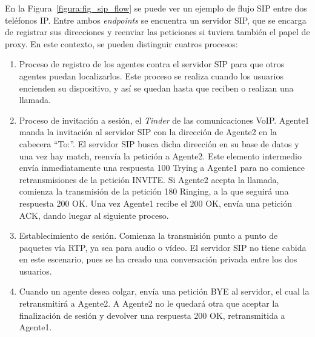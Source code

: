 \documentclass[a4paper, 12pt]{book}
\begin{document}
En la Figura~\ref{figura:fig_sip_flow} se puede ver un ejemplo de flujo SIP entre dos teléfonos IP. Entre ambos \emph{endpoints} se encuentra un servidor SIP, que se encarga de registrar sus direcciones y reenviar las peticiones si tuviera también el papel de proxy. En este contexto, se pueden distinguir cuatros procesos:
\begin{enumerate}
  \item Proceso de registro de los agentes contra el servidor SIP para que otros agentes puedan localizarlos. Este proceso se realiza cuando los usuarios encienden su dispositivo, y así se quedan hasta que reciben o realizan una llamada.
  \item Proceso de invitación a sesión, el \emph{Tinder} de las comunicaciones VoIP. Agente1 manda la invitación al servidor SIP con la dirección de Agente2 en la cabecera ``To:''. El servidor SIP busca dicha dirección en su base de datos y una vez hay match, reenvía la petición a Agente2. Este elemento intermedio envía inmediatamente una respuesta 100 Trying a Agente1 para no comience retransmisiones de la petición INVITE. Si Agente2 acepta la llamada, comienza la transmisión de la petición 180 Ringing, a la que seguirá una respuesta 200 OK. Una vez Agente1 recibe el 200 OK, envía una petición ACK, dando luegar al siguiente proceso.
  \item Establecimiento de sesión. Comienza la transmisión punto a punto de paquetes vía RTP, ya sea para audio o vídeo. El servidor SIP no tiene cabida en este escenario, pues se ha creado una conversación privada entre los dos usuarios.
  \item Cuando un agente desea colgar, envía una petición BYE al servidor, el cual la retransmitirá a Agente2. A Agente2 no le quedará otra que aceptar la finalización de sesión y devolver una respuesta 200 OK, retransmitida a Agente1.
\end{enumerate}
\end{document}
